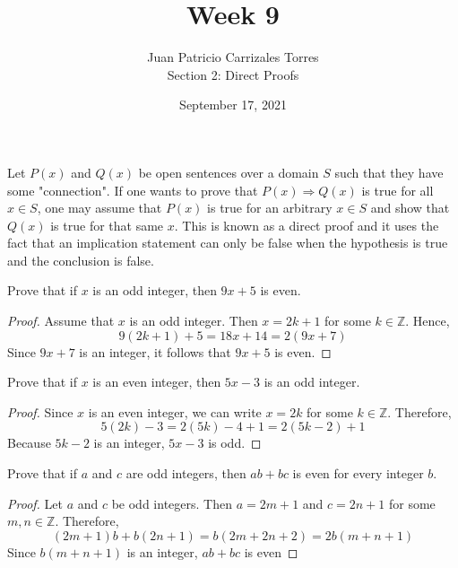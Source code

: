 \documentclass[12pt]{article}
\newcommand{\Z}{\mathbb{Z}}
\newenvironment{problem}[2][Problem]{\begin{trivlist}
		\item[\hskip \labelsep {\bfseries #1}\hskip \labelsep {\bfseries #2.}]}{\end{trivlist}}
\begin{document}
	
	\title{Week 9}
	\author{Juan Patricio Carrizales Torres \\
		Section 2: Direct Proofs}
	\date{September 17, 2021}
	\maketitle
	 
	Let $P(x)$ and $Q(x)$ be open sentences over a domain $S$ such that they have some "connection".
	If one wants to prove that $P(x)\Rightarrow Q(x)$ is true for all $x \in S$, one may assume that $P(x)$ is true for an arbitrary $x\in S$ and show that $Q(x)$ is true for that same $x$. This is known as a direct proof and it uses the fact that an implication statement can only be false when the hypothesis is true and the conclusion is false. 
	
	\begin{problem}{8}
		Prove that if $x$ is an odd integer, then $9x+5$ is even.
		\begin{proof}
			Assume that $x$ is an odd integer. Then $x=2k+1$ for some $k \in \Z$. Hence,
			\begin{equation*}
				9(2k+1)+5 = 18x+14 = 2(9x+7)
			\end{equation*}
		Since $9x+7$ is an integer, it follows that $9x+5$ is even.
		\end{proof}
	\end{problem}

	\begin{problem}{9}
		Prove that if $x$ is an even integer, then $5x-3$ is an odd integer.
		\begin{proof}
			Since $x$ is an even integer, we can write $x=2k$ for some $k\in \Z$. Therefore,
			\begin{equation*}
				5(2k)-3 = 2(5k) -4+1 = 2(5k-2)+1
			\end{equation*}
			Because $5k-2$ is an integer, $5x-3$ is odd.
		\end{proof}
	\end{problem}

	\begin{problem}{10}
		Prove that if $a$ and $c$ are odd integers, then $ab+bc$ is even for every integer $b$.
		\begin{proof}
			Let $a$ and $c$ be odd integers. Then $a=2m+1$ and $c=2n+1$ for some $m,n\in \Z$. Therefore,
			\begin{equation}
				(2m+1)b+b(2n+1)= b(2m+2n+2)=2b(m+n+1)
			\end{equation}
			Since $b(m+n+1)$ is an integer, $ab+bc$ is even
		\end{proof}
	\end{problem}
\end{document}

